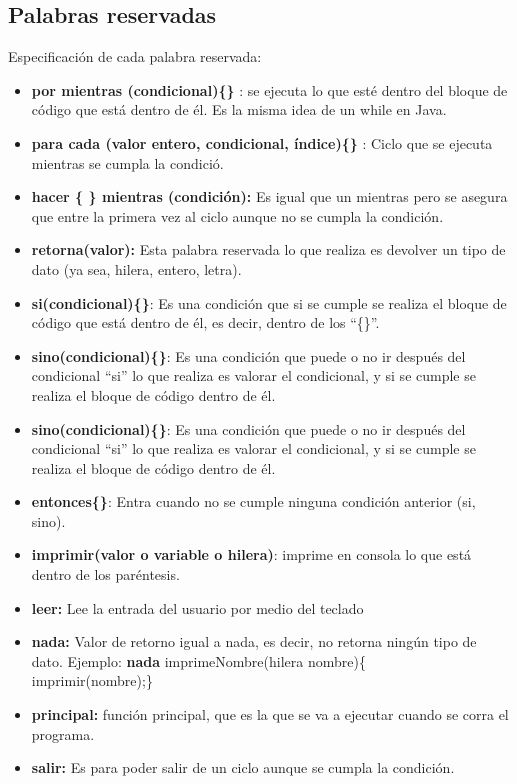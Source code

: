 \documentclass[%
 aip,
 jmp,%
 amsmath,amssymb,
 reprint,%
]{revtex4-1}
\begin{document}
\subsection{\label{sec:level2}Palabras reservadas}
Especificación de cada palabra reservada:\\
\begin{itemize}
\item\textbf{por mientras (condicional)\{\}} : se ejecuta lo que esté dentro del bloque de código que está dentro de él. Es la misma idea de un while en Java.
\item\textbf{para cada (valor entero, condicional, índice)\{\}} : Ciclo que se ejecuta mientras se cumpla la condició.
\item\textbf{hacer \{ \}  mientras (condición):} Es igual que un mientras pero se asegura que entre la primera vez al ciclo aunque no se cumpla la condición. 
\item\textbf{retorna(valor):} Esta palabra reservada lo que realiza es devolver un tipo de dato (ya sea, hilera, entero, letra).
\item\textbf{si(condicional)\{\}}: Es una condición que si se cumple se realiza el bloque de código que está dentro de él, es decir, dentro de los “\{\}”.
\item\textbf{sino(condicional)\{\}}: Es una condición que  puede o no ir después del condicional “si” lo que realiza es valorar el condicional, y si se cumple se realiza el bloque de código dentro de él. 
\item\textbf{sino(condicional)\{\}}: Es una condición que  puede o no ir después del condicional “si” lo que realiza es valorar el condicional, y si se cumple se realiza el bloque de código dentro de él. 
\item\textbf{entonces\{\}}: Entra cuando no se cumple ninguna condición anterior (si, sino). 
\item\textbf{imprimir(valor o variable o hilera)}: imprime en consola lo que está dentro de los paréntesis. 
\item\textbf{leer:} Lee la entrada del usuario por medio del teclado
\item\textbf{nada:} Valor de retorno igual a nada, es decir, no retorna ningún tipo de dato. Ejemplo: \textbf{nada} imprimeNombre(hilera nombre)\{ \\ imprimir(nombre);\} 
\item\textbf{principal:} función principal, que es la que se va a ejecutar cuando se corra el programa. 
\item\textbf{salir:} Es para poder salir de un ciclo aunque se cumpla la condición.

\end{itemize}
\end{document}
